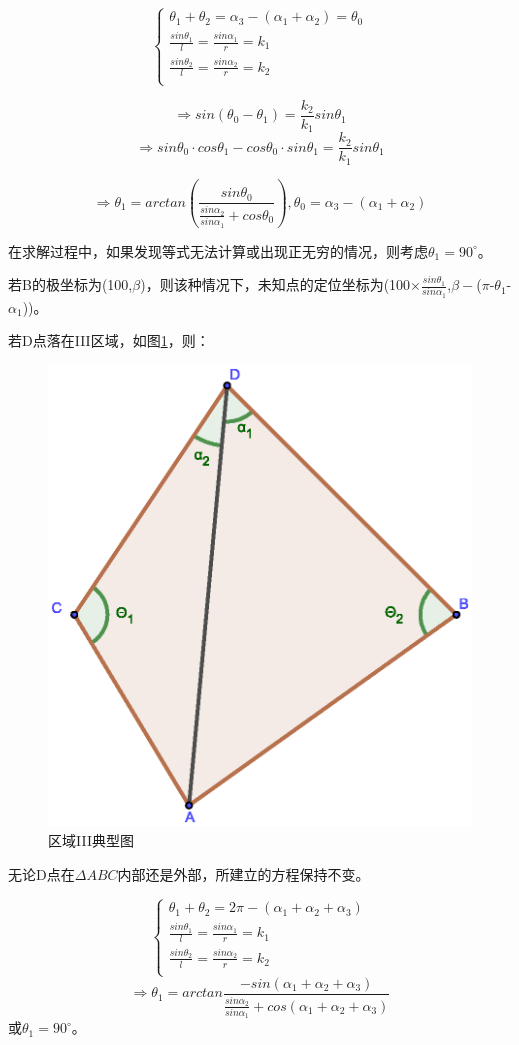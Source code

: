 \documentclass{ctexart}
\begin{document}
\begin{equation}
    \left\{
              \begin{array}{ll}
                \theta_1+\theta_2=\alpha_3-(\alpha_1+\alpha_2)=\theta_0\\
                \frac{sin\theta_1}{l}=\frac{sin\alpha_1}{r}=k_1\\
                \frac{sin\theta_2}{l}=\frac{sin\alpha_2}{r}=k_2\\

              \end{array}
            \right.
\end{equation}

\[
    \Rightarrow sin(\theta_0-\theta_1)=\frac{k_2}{k_1}sin\theta_1
\]
\[
    \Rightarrow sin\theta_0 \cdot cos\theta_1-cos\theta_0 \cdot sin\theta_1=\frac{k_2}{k_1}sin\theta_1
\]

\[
    \Rightarrow \theta_1=arctan(\frac{sin\theta_0}{\frac{sin\alpha_2}{sin\alpha_1}+cos\theta_0}),\theta_0=\alpha_3-(\alpha_1+\alpha_2)
\]

在求解过程中，如果发现等式无法计算或出现正无穷的情况，则考虑$\theta_1=90^{\circ}$。

若B的极坐标为(100,$\beta$)，则该种情况下，未知点的定位坐标为(100$\times\frac{sin\theta_1}{sin\alpha_1}$,$\beta -$($\pi$-$\theta_1$-$\alpha_1$))。



若D点落在III区域，如图\ref{区域III典型图}，则：

\begin{figure}[H]
  \centering
  \includegraphics[width=0.35\linewidth]{pic/case3+.eps}
  \caption{区域III典型图}
  \label{区域III典型图}
  \end{figure} 


无论D点在$\Delta ABC$内部还是外部，所建立的方程保持不变。

\begin{equation}
    \left\{
              \begin{array}{ll}
                \theta_1+\theta_2=2\pi-(\alpha_1+\alpha_2+\alpha_3)\\
                \frac{sin\theta_1}{l}=\frac{sin\alpha_1}{r}=k_1\\
                \frac{sin\theta_2}{l}=\frac{sin\alpha_2}{r}=k_2\\

              \end{array}
            \right.
\end{equation}
\[
    \Rightarrow \theta_1=arctan \frac{-sin(\alpha_1+\alpha_2+\alpha_3)}{\frac{sin\alpha_2}{sin\alpha_1}+cos(\alpha_1+\alpha_2+\alpha_3)}
\]
或$\theta_1=90^{\circ}$。
\end{document}
